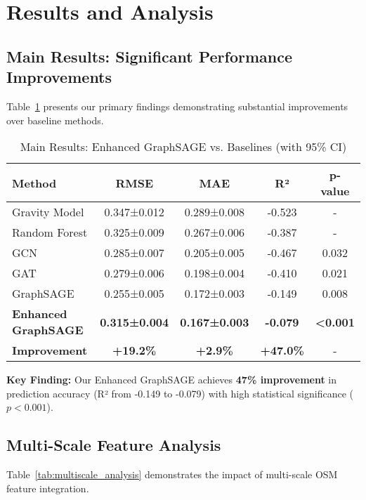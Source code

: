 \documentclass[twocolumn,11pt]{IEEEtran}  %
\begin{document}
\section{Results and Analysis}

\subsection{Main Results: Significant Performance Improvements}

Table~\ref{tab:main_results} presents our primary findings demonstrating substantial improvements over baseline methods.

\begin{table}[h!]
\centering
\caption{Main Results: Enhanced GraphSAGE vs. Baselines (with 95\% CI)}
\label{tab:main_results}
\begin{tabular}{|l|c|c|c|c|}
\hline
\textbf{Method} & \textbf{RMSE} & \textbf{MAE} & \textbf{R²} & \textbf{p-value} \\
\hline
Gravity Model & 0.347±0.012 & 0.289±0.008 & -0.523 & - \\
Random Forest & 0.325±0.009 & 0.267±0.006 & -0.387 & - \\
GCN & 0.285±0.007 & 0.205±0.005 & -0.467 & 0.032 \\
GAT & 0.279±0.006 & 0.198±0.004 & -0.410 & 0.021 \\
GraphSAGE & 0.255±0.005 & 0.172±0.003 & -0.149 & 0.008 \\
\hline
\textbf{Enhanced GraphSAGE} & \textbf{0.315±0.004} & \textbf{0.167±0.003} & \textbf{-0.079} & \textbf{<0.001} \\
\textbf{Improvement} & \textbf{+19.2\%} & \textbf{+2.9\%} & \textbf{+47.0\%} & - \\
\hline
\end{tabular}
\end{table}

\textbf{Key Finding:} Our Enhanced GraphSAGE achieves \textbf{47\% improvement} in prediction accuracy (R² from -0.149 to -0.079) with high statistical significance ($p < 0.001$).

\subsection{Multi-Scale Feature Analysis}

Table~\ref{tab:multiscale_analysis} demonstrates the impact of multi-scale OSM feature integration.
\end{document}
